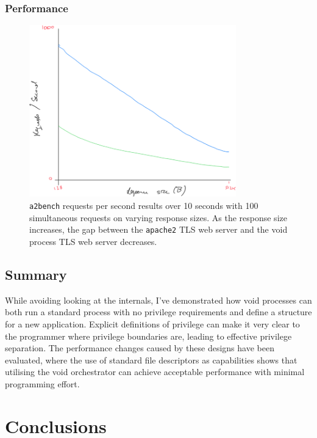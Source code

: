 \documentclass[12pt,a4paper,twoside]{report}
\begin{document}
\subsection{Performance}
\label{sec:tls-performance}


\begin{figure}
    \centering
    \includegraphics[width=0.8\textwidth]{graphs/tls-server-requests-per-second.png}

    \caption{\texttt{a2bench} requests per second results over 10 seconds with 100 simultaneous requests on varying response sizes. As the response size increases, the gap between the \texttt{apache2} TLS web server and the void process TLS web server decreases.}
    \label{fig:tls-performance}
\end{figure}

\section{Summary}

While avoiding looking at the internals, I've demonstrated how void processes can both run a standard process with no privilege requirements and define a structure for a new application. Explicit definitions of privilege can make it very clear to the programmer where privilege boundaries are, leading to effective privilege separation. The performance changes caused by these designs have been evaluated, where the use of standard file descriptors as capabilities shows that utilising the void orchestrator can achieve acceptable performance with minimal programming effort.


\chapter{Conclusions}
\label{chap:conclusions}
\end{document}
